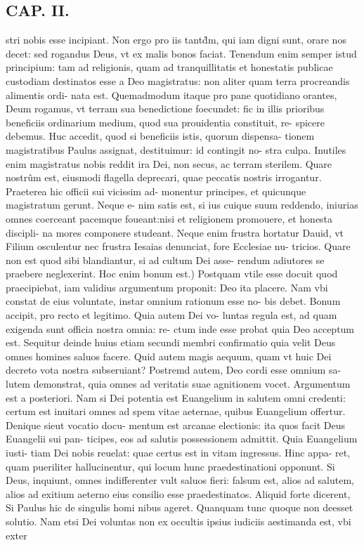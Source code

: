 \documentclass{article}
\begin{document}
\begin{pages}
\section*{CAP. II. }
\marginpar{[ p.19 ]}\pstart stri nobis esse incipiant. Non ergo pro iis tantd̀m, qui iam digni sunt, orare nos decet: sed rogandus Deus, vt ex malis bonos faciat. Tenendum enim semper istud principium: tam ad religionis, quam ad tranquillitatis et honestatis publicae custodiam destinatos esse a Deo magistratus: non aliter quam terra procreandis alimentis ordi- nata est. Quemadmodum itaque pro pane quotidiano orantes, Deum rogamus, vt terram sua benedictione foecundet: fic in illis prioribus beneficiis ordinarium medium, quod sua prouidentia constituit, re- spicere debemus. Huc accedit, quod si beneficiis istis, quorum dispensa- tionem magistratibus Paulus assignat, destituimur: id contingit no- stra culpa. Inutiles enim magistratus nobis reddit ira Dei, non secus, ac terram sterilem. Quare nostrûm est, eiusmodi flagella deprecari, quae peccatis nostris irrogantur. Praeterea hic officii sui vicissim ad- monentur principes, et quicunque magistratum gerunt. Neque e- nim satis est, si ius cuique suum reddendo, iniurias omnes coerceant pacemque foueant:nisi et religionem promouere, et honesta discipli- na mores componere studeant. Neque enim frustra hortatur Dauid, vt Filium osculentur nec frustra Iesaias denunciat, fore Ecclesiae nu- tricios. Quare non est quod sibi blandiantur, si ad cultum Dei asse- rendum adiutores se praebere neglexerint.  \pend\pstart Hoc enim bonum est.) Postquam vtile esse docuit quod praecipiebat, iam validius argumentum proponit: Deo ita placere. Nam vbi constat de eius voluntate, instar omnium rationum esse no- bis debet. Bonum accipit, pro recto et legitimo. Quia autem Dei vo- luntas regula est, ad quam exigenda sunt officia nostra omnia: re- ctum inde esse probat quia Deo acceptum est. Sequitur deinde huius etiam secundi membri confirmatio quia velit Deus omnes homines saluos facere. Quid autem magis aequum, quam vt huic Dei decreto vota nostra subseruiant? Postremd autem, Deo cordi esse omnium sa- lutem demonstrat, quia omnes ad veritatis suae agnitionem vocet. Argumentum est a posteriori. Nam si Dei potentia est Euangelium in salutem omni credenti: certum est inuitari omnes ad spem vitae aeternae, quibus Euangelium offertur. Denique sieut vocatio docu- mentum est arcanae electionis: ita quos facit Deus Euangelii sui pan- ticipes, eos ad salutis possessionem admittit. Quia Euangelium iusti- tiam Dei nobis reuelat: quae certus est in vitam ingressus. Hinc appa- ret, quam pueriliter hallucinentur, qui locum hunc praedestinationi opponunt. Si Deus, inquiunt, omnes indifferenter vult saluos fieri: falsum est, alios ad salutem, alios ad exitium aeterno eius consilio esse praedestinatos. Aliquid forte dicerent, Si Paulus hic de singulis homi nibus ageret. Quanquam tunc quoque non deesset solutio. Nam etsi Dei voluntas non ex occultis ipsius iudiciis aestimanda est, vbi exter  \pend

\end{pages}
\end{document}
